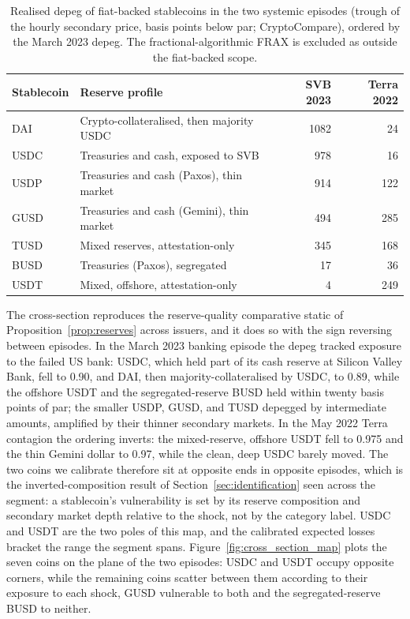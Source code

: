 \begin{table}[H]
\centering
\caption{Realised depeg of fiat-backed stablecoins in the two systemic episodes (trough of the hourly secondary price, basis points below par; CryptoCompare), ordered by the March 2023 depeg. The fractional-algorithmic FRAX is excluded as outside the fiat-backed scope.}\label{tab:cross_section}
\begin{tabular}{llrr}
\toprule
Stablecoin & Reserve profile & SVB 2023 & Terra 2022 \\
\midrule
DAI  & Crypto-collateralised, then majority USDC & 1082 & 24 \\
USDC & Treasuries and cash, exposed to SVB        & 978  & 16 \\
USDP & Treasuries and cash (Paxos), thin market   & 914  & 122 \\
GUSD & Treasuries and cash (Gemini), thin market  & 494  & 285 \\
TUSD & Mixed reserves, attestation-only           & 345  & 168 \\
BUSD & Treasuries (Paxos), segregated             & 17   & 36 \\
USDT & Mixed, offshore, attestation-only          & 4    & 249 \\
\bottomrule
\end{tabular}
\end{table}

The cross-section reproduces the reserve-quality comparative static of Proposition~\ref{prop:reserves} across issuers, and it does so with the sign reversing between episodes. In the March 2023 banking episode the depeg tracked exposure to the failed US bank: USDC, which held part of its cash reserve at Silicon Valley Bank, fell to 0.90, and DAI, then majority-collateralised by USDC, to 0.89, while the offshore USDT and the segregated-reserve BUSD held within twenty basis points of par; the smaller USDP, GUSD, and TUSD depegged by intermediate amounts, amplified by their thinner secondary markets. In the May 2022 Terra contagion the ordering inverts: the mixed-reserve, offshore USDT fell to 0.975 and the thin Gemini dollar to 0.97, while the clean, deep USDC barely moved. The two coins we calibrate therefore sit at opposite ends in opposite episodes, which is the inverted-composition result of Section~\ref{sec:identification} seen across the segment: a stablecoin's vulnerability is set by its reserve composition and secondary market depth relative to the shock, not by the category label. USDC and USDT are the two poles of this map, and the calibrated expected losses bracket the range the segment spans. Figure~\ref{fig:cross_section_map} plots the seven coins on the plane of the two episodes: USDC and USDT occupy opposite corners, while the remaining coins scatter between them according to their exposure to each shock, GUSD vulnerable to both and the segregated-reserve BUSD to neither.


